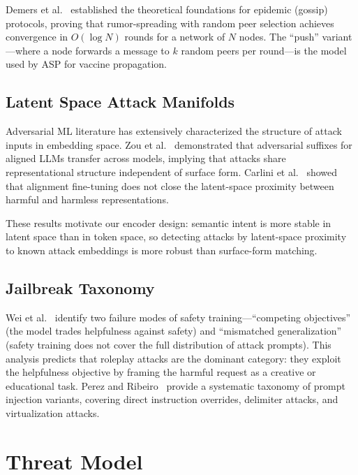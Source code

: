\documentclass[sigconf,natbib=false]{acmart}
\begin{document}
Demers et al.~\cite{demers1987epidemic} established the theoretical
foundations for epidemic (gossip) protocols, proving that rumor-spreading
with random peer selection achieves convergence in $O(\log N)$ rounds for
a network of $N$ nodes. The ``push'' variant—where a node forwards a
message to $k$ random peers per round—is the model used by ASP for
vaccine propagation.

\subsection{Latent Space Attack Manifolds}
\label{sec:bg:manifolds}

Adversarial ML literature has extensively characterized the structure of
attack inputs in embedding space. Zou et al.~\cite{zou2023universal}
demonstrated that adversarial suffixes for aligned LLMs transfer across
models, implying that attacks share representational structure independent
of surface form. Carlini et al.~\cite{carlini2023aligned} showed that
alignment fine-tuning does not close the latent-space proximity between
harmful and harmless representations.

These results motivate our encoder design: semantic intent is more stable
in latent space than in token space, so detecting attacks by latent-space
proximity to known attack embeddings is more robust than surface-form matching.

\subsection{Jailbreak Taxonomy}
\label{sec:bg:taxonomy}

Wei et al.~\cite{wei2023jailbroken} identify two failure modes of safety
training—``competing objectives'' (the model trades helpfulness against
safety) and ``mismatched generalization'' (safety training does not cover
the full distribution of attack prompts). This analysis predicts that
roleplay attacks are the dominant category: they exploit the helpfulness
objective by framing the harmful request as a creative or educational task.
Perez and Ribeiro~\cite{perez2022ignore} provide a systematic taxonomy of
prompt injection variants, covering direct instruction overrides, delimiter
attacks, and virtualization attacks.

\section{Threat Model}
\label{sec:threat}
\end{document}
